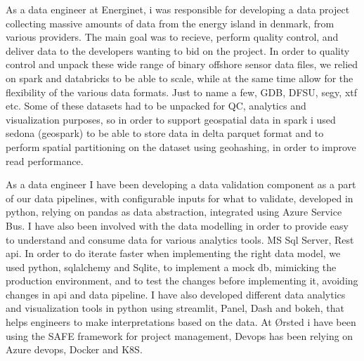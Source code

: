 \begin{itemize}
As a data engineer at Energinet, i was responsible for developing a data project collecting massive amounts of data from the energy island in denmark, from various providers. The main goal was to recieve, perform quality control, and deliver data to the developers wanting to bid on the project. In order to quality control and unpack these wide range of binary offshore sensor data files, we relied on spark and databricks to be able to scale, while at the same time allow for the flexibility of the various data formats. Just to name a few, GDB, DFSU, segy, xtf etc. Some of these datasets had to be unpacked for QC, analytics and visualization purposes, so in order to support geospatial data in spark i used sedona (geospark) to be able to store data in delta parquet format and to perform spatial partitioning on the dataset using geohashing, in order to improve read performance.
\end{itemize}
          
\divider

\begin{itemize}
As a data engineer I have been developing a data validation component as a part of our data pipelines, with configurable inputs for what to validate, developed in python, relying on pandas as data abstraction, integrated using Azure Service Bus. I have also been involved with the data modelling in order to provide easy to understand and consume data for various analytics tools. MS Sql Server, Rest api. In order to do iterate faster when implementing the right data model, we used python, sqlalchemy and Sqlite, to implement a mock db, mimicking the production environment, and to test the changes before implementing it, avoiding changes in api and data pipeline. I have also developed different data analytics and visualization tools in python using streamlit, Panel, Dash and bokeh, that helps engineers to make interpretations based on the data. At Ørsted i have been using the SAFE framework for project management, Devops has been relying on Azure devops, Docker and K8S.
\end{itemize}
              
\divider

